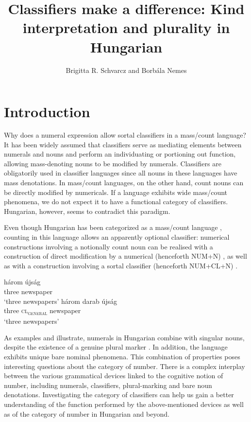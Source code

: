 \documentclass[output=paper]{langscibook}
\author{Brigitta R. Schvarcz \affiliation{Bar-Ilan University and Afeka College of Engineering} and  Borbála Nemes\affiliation{Babeș-Bolyai University}}
\title[Classifiers make a difference]{Classifiers make a difference: Kind interpretation and plurality in Hungarian}
\begin{document}
\maketitle

\section{Introduction}

Why does a numeral expression allow sortal classifiers in a mass/count language? It has been widely assumed that classifiers serve as mediating elements between numerals and nouns and perform an individuating or portioning out function, allowing mass-denoting nouns to be modified by numerals.  Classifiers are obligatorily used in classifier languages since all nouns in these languages have mass denotations. In mass/count languages, on the other hand, count nouns can be directly modified by numericals. If a language exhibits wide mass/count phenomena, we do not expect it to have a functional category of classifiers. Hungarian, however, seems to contradict this paradigm.

Even though Hungarian has been categorized as a mass/count language  \linebreak\citep{schvarcz-14, schvarcz-rothstein-17}, counting in this language allows an apparently optional classifier: numerical constructions involving a notionally count noun can be realised with a construction of direct modification by a numerical (henceforth NUM+N) , as well as with a construction involving a sortal classifier (henceforth NUM+CL+N) . 

\ea \label{schv-nem:ex:1}
\ea \label{schv-nem:ex:1a}
\gll három  újság\\  
     three newspaper\\ 
\glt `three newspapers'
\ex \label{schv-nem:ex:1b}
\gll három darab újság\\
    three \textsc{cl\textsubscript{general}} newspaper\\
\glt `three newspapers'
\z
\z

\noindent As examples  and  illustrate, numerals in Hungarian combine with singular nouns, despite the existence of a genuine plural marker \citep{schvarcz-rothstein-17}.  In addition, the language exhibits unique bare nominal phenomena. This combination of properties poses interesting questions about the category of number. There is a complex interplay between the various grammatical devices linked to the cognitive notion of number, including numerals, classifiers, plural-marking and bare noun denotations. Investigating the category of classifiers can help us gain a better understanding of the function performed by the above-mentioned devices as well as of the category of number in Hungarian and beyond.
\end{document}
